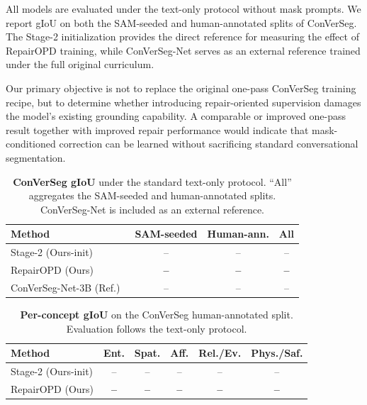 All models are evaluated under the text-only protocol without mask prompts.
We report gIoU on both the SAM-seeded and human-annotated splits of ConVerSeg.
The Stage-2 initialization provides the direct reference for measuring the effect of RepairOPD training, while ConVerSeg-Net serves as an external reference trained under the full original curriculum.

Our primary objective is not to replace the original one-pass ConVerSeg training recipe, but to determine whether introducing repair-oriented supervision damages the model's existing grounding capability.
A comparable or improved one-pass result together with improved repair performance would indicate that mask-conditioned correction can be learned without sacrificing standard conversational segmentation.


\begin{table}[t]
    \centering
    \caption{
    \textbf{ConVerSeg gIoU} under the standard text-only protocol.
    ``All'' aggregates the SAM-seeded and human-annotated splits.
    ConVerSeg-Net is included as an external reference.
    }
    \label{tab:convseg_main}
    \small
    \setlength{\tabcolsep}{5pt}
    \begin{tabular}{lccc}
        \toprule
        \textbf{Method}
        & SAM-seeded
        & Human-ann.
        & All \\
        \midrule
        Stage-2 (Ours-init)
        & --
        & --
        & -- \\

        RepairOPD (Ours)
        & \textbf{--}
        & \textbf{--}
        & \textbf{--} \\

        \midrule

        ConVerSeg-Net-3B (Ref.)~\cite{sahoo2026convseg}
        & --
        & --
        & -- \\
        \bottomrule
    \end{tabular}
\end{table}


\begin{table}[t]
    \centering
    \caption{
    \textbf{Per-concept gIoU} on the ConVerSeg human-annotated split.
    Evaluation follows the text-only protocol.
    }
    \label{tab:convseg_concept}
    \small
    \setlength{\tabcolsep}{3.5pt}
    \begin{tabular}{lccccc}
        \toprule
        \textbf{Method}
        & Ent.
        & Spat.
        & Aff.
        & Rel./Ev.
        & Phys./Saf. \\
        \midrule
        Stage-2 (Ours-init)
        & --
        & --
        & --
        & --
        & -- \\

        RepairOPD (Ours)
        & \textbf{--}
        & \textbf{--}
        & \textbf{--}
        & \textbf{--}
        & \textbf{--} \\
        \bottomrule
    \end{tabular}
\end{table}


